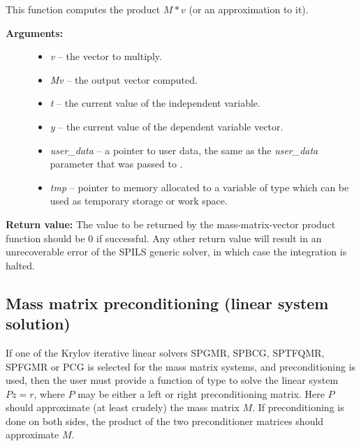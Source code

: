 \documentclass[letterpaper,10pt,english]{sphinxmanual}
\begin{document}
\begin{fulllineitems}
\label{c_interface/User_supplied:ARKSpilsMassTimesVecFn}
This function computes the product $M*v$ (or an approximation to it).
\begin{description}
\item[{\textbf{Arguments:}}] \leavevmode\begin{itemize}
\item {} 
\emph{v} -- the vector to multiply.

\item {} 
\emph{Mv} -- the output vector computed.

\item {} 
\emph{t} -- the current value of the independent variable.

\item {} 
\emph{y} -- the current value of the dependent variable vector.

\item {} 
\emph{user\_data} -- a pointer to user data, the same as the
\emph{user\_data} parameter that was passed to {\hyperref[c_interface/User_callable:ARKodeSetUserData]{}}.

\item {} 
\emph{tmp} -- pointer to memory allocated to a variable of type
 which can be used as temporary storage or work space.

\end{itemize}

\end{description}

\textbf{Return value:}
The value to be returned by the mass-matrix-vector product
function should be 0 if successful. Any other return value will
result in an unrecoverable error of the SPILS generic solver,
in which case the integration is halted.

\end{fulllineitems}



\subsection{Mass matrix preconditioning (linear system solution)}
\label{c_interface/User_supplied:cinterface-massprecsolvefn}\label{c_interface/User_supplied:mass-matrix-preconditioning-linear-system-solution}
If one of the Krylov iterative linear solvers SPGMR, SPBCG, SPTFQMR,
SPFGMR or PCG is selected for the mass matrix systems, and
preconditioning is used, then the user must provide a function of type
{\hyperref[c_interface/User_supplied:ARKSpilsMassPrecSolveFn]{}} to solve the linear system
$Pz=r$, where $P$ may be either a left or right
preconditioning matrix.  Here $P$ should approximate (at least
crudely) the mass matrix $M$.  If preconditioning is done on
both sides, the product of the two preconditioner matrices should
approximate $M$.
\end{document}
